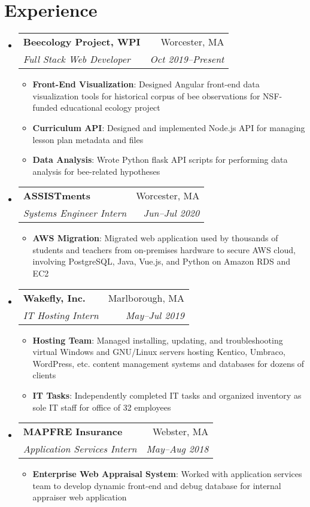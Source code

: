 \documentclass[a4paper,11pt]{article}
\makeatletter
\newcommand{\resumeItem}[2]{
  \item\small{
    \textbf{#1}{: #2 \vspace{-2pt}}
  }
}
\newcommand{\resumeSubheading}[4]{
  \vspace{-1pt}\item
    \begin{tabular*}{0.97\textwidth}{l@{\extracolsep{\fill}}r}
      \textbf{#1} & #2 \\
      \textit{\small#3} & \textit{\small #4} \\
    \end{tabular*}\vspace{-5pt}
}
\newcommand{\resumeSubHeadingListStart}{\begin{itemize}[leftmargin=*]}
\newcommand{\resumeSubHeadingListEnd}{\end{itemize}}
\newcommand{\resumeItemListStart}{\begin{itemize}}
\newcommand{\resumeItemListEnd}{\end{itemize}\vspace{-5pt}}
\makeatother
\begin{document}
\section{Experience}
  \resumeSubHeadingListStart
	\resumeSubheading
	  {Beecology Project, WPI}{Worcester, MA}
	  {Full Stack Web Developer}{Oct 2019--Present}
	  \resumeItemListStart
		  \resumeItem{Front-End Visualization} {Designed Angular front-end data
			  visualization tools for historical corpus of bee observations for
			  NSF-funded educational ecology project} 
		  \resumeItem{Curriculum API} {Designed and implemented Node.js API for
			  managing lesson plan metadata and files}
		  \resumeItem{Data Analysis} {Wrote Python flask API scripts for
			  performing data analysis for bee-related hypotheses}
	  \resumeItemListEnd

	\resumeSubheading
	  {ASSISTments}{Worcester, MA}
	  {Systems Engineer Intern}{Jun--Jul 2020}
	  \resumeItemListStart
		  \resumeItem{AWS Migration} {Migrated web
			  application used by thousands of students and teachers from
			  on-premises hardware to secure AWS cloud, involving PostgreSQL,
			  Java, Vue.js, and Python on Amazon RDS and EC2} 
	  \resumeItemListEnd
  	
    \resumeSubheading
      {Wakefly, Inc.}{Marlborough, MA}
      {IT Hosting Intern}{May--Jul 2019}
      \resumeItemListStart
        \resumeItem{Hosting Team}
		  {Managed installing, updating, and troubleshooting virtual Windows and
			  GNU/Linux servers hosting Kentico, Umbraco, WordPress, etc.
			  content management systems and databases for dozens of clients}
		\resumeItem{IT Tasks}
		  {Independently completed IT tasks and organized inventory as sole IT
			  staff for office of 32 employees}
      \resumeItemListEnd

    \resumeSubheading
      {MAPFRE Insurance}{Webster, MA}
      {Application Services Intern}{May--Aug 2018}
      \resumeItemListStart
	    \resumeItem{Enterprise Web Appraisal System}
		{Worked with application services team to develop dynamic front-end and
			debug database for internal appraiser web application}
      \resumeItemListEnd
  \resumeSubHeadingListEnd


\end{document}
